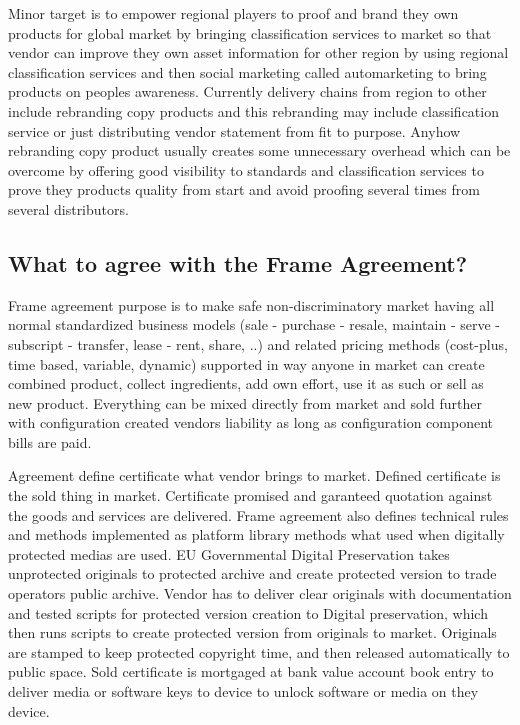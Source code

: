 Minor target is to empower regional players to proof and brand they own
products for global market by bringing classification services to market so
that vendor can improve they own asset information for other region by using
regional classification services and then social marketing called
automarketing to bring products on peoples awareness. Currently delivery
chains from region to other include rebranding copy products and this
rebranding may include classification service or just distributing vendor
statement from fit to purpose. Anyhow rebranding copy product usually creates
some unnecessary overhead which can be overcome by offering good visibility to
standards and classification services to prove they products quality from
start and avoid proofing several times from several distributors.

\subsection{What to agree with the Frame Agreement?}
\label{frame_agreement_what}
Frame agreement purpose is to make safe non-discriminatory market having all
normal standardized business models (sale - purchase - resale, maintain -
serve - subscript - transfer, lease - rent, share, ..) and related pricing
methods (cost-plus, time based, variable, dynamic) supported in way anyone in
market can create combined product, collect ingredients, add own effort, use
it as such or sell as new product. Everything can be mixed directly from
market and sold further with configuration created vendors liability as long
as configuration component bills are paid.

Agreement define certificate what vendor brings to market. Defined
certificate is the sold thing in market. Certificate promised and garanteed
quotation against the goods and services are delivered. Frame agreement also
defines technical rules and methods implemented as platform library methods
what used when digitally protected medias are used. EU Governmental Digital
Preservation takes unprotected originals to protected archive and create
protected version to trade operators public archive. Vendor has to deliver
clear originals with documentation and tested scripts for protected version
creation to Digital preservation\allowbreak\cite{
EULegalDepositScheme}\allowbreak\cite{Vapaakappaleoikeus}\allowbreak\cite{
EuDigitalFairnessAct}\allowbreak\cite{ECI_2024_000007}, which
then runs scripts to create protected version from originals to market.
Originals are stamped to keep protected copyright time, and then released
automatically to public space. Sold certificate is mortgaged at bank value
account book entry\allowbreak\cite{BookEntry}\allowbreak\cite{
LEX_2017/384}\allowbreak\cite{EU_Settlement} to deliver media or software
keys to device to unlock software or media on they device.

